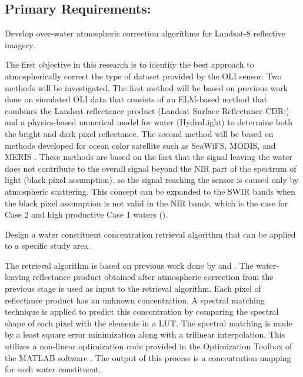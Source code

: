 \subsection{Primary Requirements:}
\begin{enumerate} 
	{\bf \item Develop over-water atmospheric correction algorithms for Landsat-8 reflective imagery.} 

The first objective in this research is to identify the best approach to atmospherically correct the type of dataset provided by the OLI sensor. Two methods will be investigated. The first method will be based on previous work done on simulated OLI data \cite{Gerace:2013,Gerace:2012,GeraceThesis,Pahlevan:2012} that consists of an ELM-based method that combines the Landsat reflectance product (Landsat Surface Reflectance CDR;\cite{LandsatCDR}) and a physics-based numerical model for water (HydroLight) to determine both the bright and dark pixel reflectance. The second method will be based on methods developed for ocean color satellite such as SeaWiFS, MODIS, and MERIS \cite{Gordon:1997}. These methods are based on the fact that the signal leaving the water does not contribute to the overall signal beyond the NIR part of the spectrum of light (black pixel assumption), so the signal reaching the sensor is caused only by atmospheric scattering. This concept can be expanded to the SWIR bands when the black pixel assumption is not valid in the NIR bands, which is the case for Case 2 and high productive Case 1 waters (\cite{Wang:2007}).

	{\bf \item Design a water constituent concentration retrieval algorithm that can be applied to a specific study area.}

The retrieval algorithm is based on previous work done by \cite{Raqueno:2003} and \cite{GeraceThesis}. The water-leaving reflectance product obtained after atmospheric correction from the previous stage is used as input to the retrieval algorithm. Each pixel of reflectance product has an unknown concentration. A spectral matching technique is applied to predict this concentration by comparing the spectral shape of each pixel with the elements in a LUT. The spectral matching is made by a least square error minimization along with a trilinear interpolation. This utilizes a non-linear optimization code provided in the Optimization Toolbox of the MATLAB software . The output of this process is a concentration mapping for each water constituent.


\end{enumerate}
